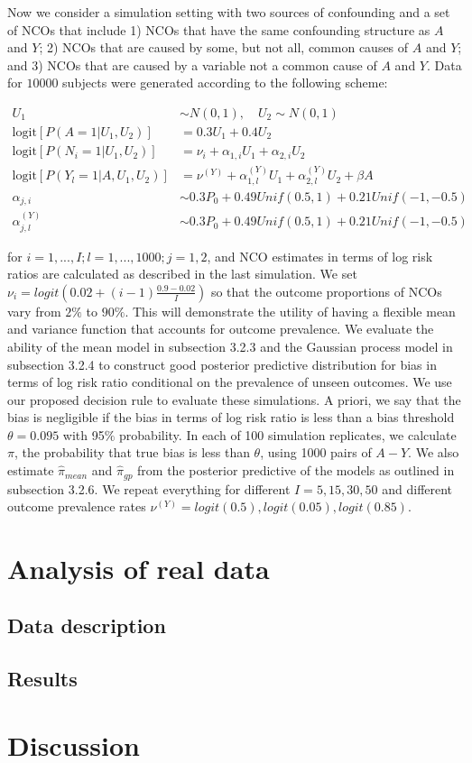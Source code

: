 Now we consider a simulation setting with two sources of confounding and a set of NCOs that include 1) NCOs that have the same confounding structure as $A$ and $Y$; 2) NCOs that are caused by some, but not all, common causes of $A$ and $Y$; and 3) NCOs that are caused by a variable not a common cause of $A$ and $Y$. Data for $10000$ subjects were generated according to the following scheme:

\begin{align*}
    U_1 &\sim N(0, 1), \quad U_2 \sim N(0, 1)\\
    \text{logit}[P(A=1|U_1, U_2)] &= 0.3 U_1 + 0.4 U_2\\
    \text{logit}[P(N_{i}=1|U_1, U_2)] &= \nu_i + \alpha_{1,i} U_1 + \alpha_{2,i} U_2 \\
    \text{logit}[P(Y_l=1|A, U_1, U_2)] &= \nu^{(Y)} + \alpha^{(Y)}_{1,l} U_1 + \alpha^{(Y)}_{2, l}U_2 + \beta A\\
    \alpha_{j,i} &\sim 0.3P_0 + 0.49 Unif(0.5, 1) + 0.21 Unif(-1, -0.5)\\
    \alpha^{(Y)}_{j,l} &\sim 0.3P_0 + 0.49 Unif(0.5, 1) + 0.21 Unif(-1, -0.5)
\end{align*}

\noindent for $i=1,..., I; l=1,...,1000; j=1,2$, and NCO estimates in terms of log risk ratios are calculated as described in the last simulation. We set $\nu_i = logit(0.02 + (i - 1)\frac{0.9-0.02}{I})$ so that the outcome proportions of NCOs vary from $2\%$ to $90\%$. This will demonstrate the utility of having a flexible mean and variance function that accounts for outcome prevalence. We evaluate the ability of the mean model in subsection 3.2.3 and the Gaussian process model in subsection 3.2.4 to construct good posterior predictive distribution for bias in terms of log risk ratio conditional on the prevalence of unseen outcomes. We use our proposed decision rule to evaluate these simulations. A priori, we say that the bias is negligible if the bias in terms of log risk ratio is less than a bias threshold $\theta = 0.095$ with 95$\%$ probability. In each of 100 simulation replicates, we calculate $\pi$, the probability that true bias is less than $\theta$, using 1000 pairs of $A-Y$. We also estimate $\hat{\pi}_{mean}$ and $\hat{\pi}_{gp}$ from the posterior predictive of the models as outlined in subsection 3.2.6. We repeat everything for different $I=5, 15, 30, 50$ and different outcome prevalence rates $\nu^{(Y)} = logit(0.5), logit(0.05), logit(0.85)$.


\section{Analysis of real data}
\subsection{Data description}
\subsection{Results}

\section{Discussion}

